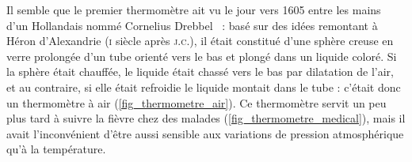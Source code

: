 	Il semble que le premier thermomètre ait vu le jour vers 1605 entre les mains d'un Hollandais nommé Cornelius Drebbel~\cite{locqueneux1996} : basé sur des idées remontant à Héron d'Alexandrie (\textsc{i}\xspace siècle après \textsc{j.c.}), il était constitué d'une sphère creuse en verre prolongée d'un tube orienté vers le bas et plongé dans un liquide coloré. Si la sphère était chauffée, le liquide était chassé vers le bas par dilatation de l'air, et au contraire, si elle était refroidie le liquide montait dans le tube : c'était donc un thermomètre à air (\cref{fig_thermometre_air}). Ce thermomètre servit un peu plus tard à suivre la fièvre chez des malades (\cref{fig_thermometre_medical}), mais il avait l'inconvénient d'être aussi sensible aux variations de pression atmosphérique qu'à la température.

